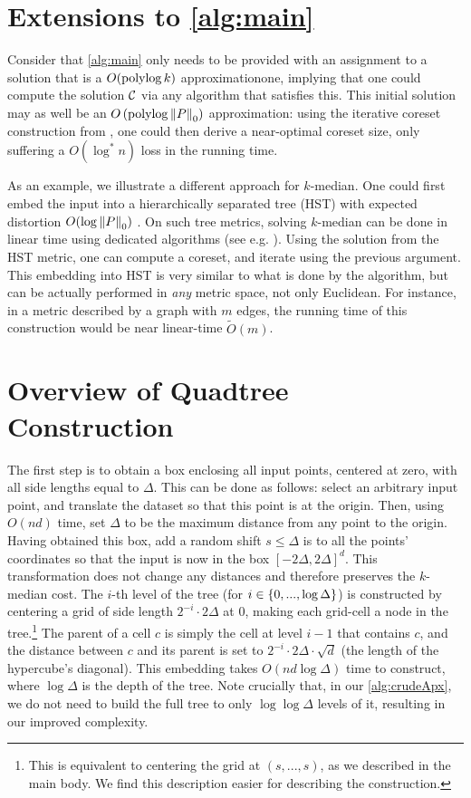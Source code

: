 \section{Extensions to \cref{alg:main}} 
\label{app:extensions}
Consider that \cref{alg:main}  only needs to be provided with an assignment to a solution that is a $O(\operatorname{polylog} k)$ approximationone, implying that one could
compute the solution $\mathcal C$ via any algorithm that satisfies this.  This initial solution may as well be an $O\left(\operatorname{polylog} \left\| P \right\|_0 \right)$
approximation: using the iterative coreset construction from \cite{BravermanJKW21}, one could then derive a near-optimal coreset size, only suffering
a $O(\log^* n)$ loss in the running time.

As an example, we illustrate a different approach for $k$-median. One could first embed the input into a hierarchically separated tree (HST) with expected
distortion $O(\log \left\| P \right\|_0)$ \cite{FakcharoenpholRT03}. On such tree metrics, solving $k$-median can be done in linear time using dedicated algorithms
(see e.g. \cite{Cohen-AddadLNSS21}). Using the solution from the HST metric, one can compute a coreset, and iterate using the previous argument.  This embedding
into HST is very similar to what is done by the \fkmeans algorithm, but can be actually performed in \emph{any} metric space, not only Euclidean.  For instance,
in a metric described by a graph with $m$ edges, the running time of this construction would be near linear-time $\tilde O(m)$.

\section{Overview of Quadtree Construction}
\label{app:quadtree}

The first step is to obtain a box enclosing all input points, centered at zero, with all side lengths equal to
$\Delta$. This can be done as follows: select an arbitrary input point, and translate the dataset so that this point is at the origin. Then, using
$O(nd)$ time, set $\Delta$ to be the maximum distance from any point to the origin. Having obtained this box, add a random shift $s \leq \Delta$ is to all the points'
coordinates so that the input is now in the box $[-2\Delta, 2\Delta]^d$. This transformation does not change any distances and therefore preserves the
$k$-median cost.  The $i$-th level of the tree (for $i \in \left\{ 0, ..., \log \Delta \right\}$) is constructed by centering a grid of side length $2^{-i} \cdot
2\Delta$ at $0$, making each grid-cell a node in the tree.\footnote{This is equivalent to centering the grid at $(s, ...,s)$, as we described in the main body. We find this description easier for describing the construction.}  The parent of a cell $c$ is simply the cell at level $i-1$ that contains $c$, and the distance
between $c$ and its parent is set to $2^{-i} \cdot 2\Delta \cdot \sqrt{d}$ (the length of the hypercube's diagonal). This embedding takes $O(nd \log \Delta)$
time to construct, where $\log \Delta$ is the depth of the tree. Note crucially that, in our \cref{alg:crudeApx}, we do not need to build the full tree to only $\log \log \Delta$ levels of it, resulting in our improved complexity.


